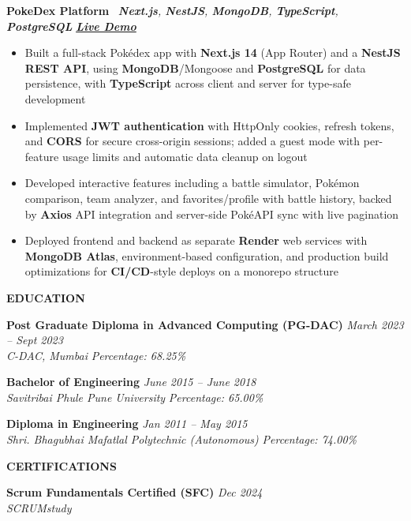 \documentclass[a4paper,10pt]{article}
\newcommand{\resumeskipsection}{\vspace{7pt}}
\newcommand{\resumeskipentry}{\vspace{5pt}}
\newcommand{\resumeskipafterheader}{\vspace{3pt}}
\newcommand{\resumejobtitle}{\fontsize{10pt}{12pt}\selectfont\bfseries\color{primary}}
\newcommand{\resumejobmeta}{\fontsize{10pt}{12pt}\selectfont\itshape\color{bodytext}}
\newcommand{\resumedate}{\fontsize{10pt}{12pt}\selectfont\itshape\color{bodytext}}
\newcommand{\kw}[1]{\textbf{\color{primary}#1}}
\newcommand{\demolink}[2]{\href{#1}{\textcolor{accent}{\textbf{#2}}}}
\newcommand{\sectionheader}[1]{%
    \resumeskipsection
    \noindent
    \colorbox{primary}{%
        \parbox{\dimexpr\linewidth-2\fboxsep}{%
            \vspace{2pt}%
            {\resumesection #1}%
            \vspace{2pt}%
        }%
    }%
    \resumeskipafterheader
}
\newcommand{\resumesection}{\fontsize{11pt}{13pt}\selectfont\bfseries\color{white}}
\newcommand{\projectentry}[4]{%
    \noindent
    {\resumejobtitle #1} \textbar\ {\resumejobmeta #2} \hfill {\resumedate #3}%
    \begin{itemize}
        #4
    \end{itemize}%
    \resumeskipentry
}
\newcommand{\educationentry}[4]{%
    \noindent
    {\resumejobtitle #1} \hfill {\resumedate #2}\\[1pt]
    {\resumejobmeta #3} \hfill {\resumedate #4}%
    \resumeskipentry
}
\begin{document}
\projectentry{PokeDex Platform}{\kw{Next.js}, \kw{NestJS}, \kw{MongoDB}, \kw{TypeScript}, \kw{PostgreSQL}}{\demolink{https://pokedex-nextjs.onrender.com}{Live Demo}}{%
    \item Built a full-stack Pok\'edex app with \kw{Next.js 14} (App Router) and a \kw{NestJS} \kw{REST API}, using \kw{MongoDB}/Mongoose and \kw{PostgreSQL} for data persistence, with \kw{TypeScript} across client and server for type-safe development
    \item Implemented \kw{JWT authentication} with HttpOnly cookies, refresh tokens, and \kw{CORS} for secure cross-origin sessions; added a guest mode with per-feature usage limits and automatic data cleanup on logout
    \item Developed interactive features including a battle simulator, Pok\'emon comparison, team analyzer, and favorites/profile with battle history, backed by \kw{Axios} API integration and server-side Pok\'eAPI sync with live pagination
    \item Deployed frontend and backend as separate \kw{Render} web services with \kw{MongoDB Atlas}, environment-based configuration, and production build optimizations for \kw{CI/CD}-style deploys on a monorepo structure
}

\sectionheader{EDUCATION}

\educationentry{Post Graduate Diploma in Advanced Computing (PG-DAC)}{March 2023 -- Sept 2023}{C-DAC, Mumbai}{Percentage: 68.25\%}

\educationentry{Bachelor of Engineering}{June 2015 -- June 2018}{Savitribai Phule Pune University}{Percentage: 65.00\%}

\educationentry{Diploma in Engineering}{Jan 2011 -- May 2015}{Shri. Bhagubhai Mafatlal Polytechnic (Autonomous)}{Percentage: 74.00\%}

\sectionheader{CERTIFICATIONS}

\educationentry{Scrum Fundamentals Certified (SFC)}{Dec 2024}{SCRUMstudy}{}
\end{document}
